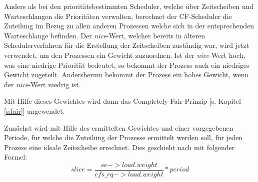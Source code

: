 Anders als bei den prioritäts\-bestim\-mten Scheduler, welche über Zeitscheiben und Warte\-schlan\-gen die Prioritäten verwalten, berechnet der CF-Scheduler die Zuteilung im Bezug zu allen anderen Prozessen welche sich in der entsprechenden Warteschlange befinden. Der  \textit{nice}-Wert, welcher bereits in älteren Scheduler\-ver\-fahren für die Erstellung der Zeitscheiben zuständig war, wird jetzt verwendet, um den Prozessen ein Gewicht zuzuordnen. Ist der  \textit{nice}-Wert hoch, was eine niedrige Priorität bedeutet, so bekommt der Prozess auch ein niedriges Gewicht zugeteilt. Andersherum bekommt der Prozess ein hohes Gewicht, wenn der  \textit{nice}-Wert niedrig ist.

Mit Hilfe dieses Gewichtes wird dann das  Completely-Fair-Prinzip [s. Kapitel \ref{s:fair}] angewendet. 

Zunächst wird mit Hilfe des ermittelten Gewichtes und einer vorgegebenen Periode, für welche die Zuteilung der Prozesse ermittelt werden soll, für jeden Prozess eine ideale Zeitscheibe errechnet. Dies geschieht nach \cite{paperfairness} mit folgender Formel:
\begin{equation}
slice = \frac{se->load.weight}{cfs\_rq->load.weight} * period
\label{eq:slice}
\end{equation}





